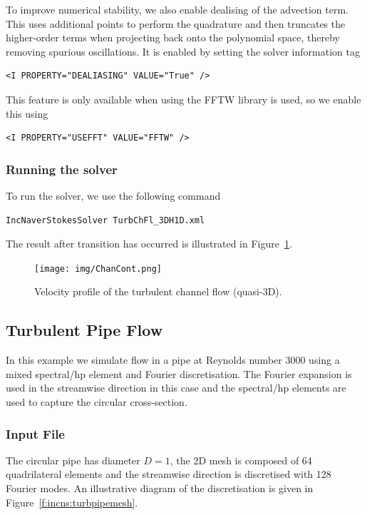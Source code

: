 To improve numerical stability, we also enable dealising of the advection term.
This uses additional points to perform the quadrature and then truncates the
higher-order terms when projecting back onto the polynomial space, thereby
removing spurious oscillations. It is enabled by setting the solver information
tag
\begin{lstlisting}[style=XMLStyle]
<I PROPERTY="DEALIASING" VALUE="True" />
\end{lstlisting}
This feature is only available when using the FFTW library is used, so we enable
this using
\begin{lstlisting}[style=XMLStyle]
<I PROPERTY="USEFFT" VALUE="FFTW" />
\end{lstlisting}


\subsubsection{Running the solver}
To run the solver, we use the following command
\begin{lstlisting}[style=BashInputStyle]
IncNaverStokesSolver TurbChFl_3DH1D.xml
\end{lstlisting}
The result after transition has occurred is illustrated in
Figure~\ref{f:incns:turbchanflow}.

\begin{figure}
\begin{center}
\texttt{[image: img/ChanCont.png]}
\caption{Velocity profile of the turbulent channel flow (quasi-3D).}
\label{f:incns:turbchanflow}
\end{center}
\end{figure}


\subsection{Turbulent Pipe Flow}
In this example we simulate flow in a pipe at Reynolds number 3000 using a mixed
spectral/hp element and Fourier discretisation. The Fourier expansion is used in
the streamwise direction in this case and the spectral/hp elements are used to
capture the circular cross-section.

\subsubsection{Input File}
The circular pipe has diameter $D=1$, the 2D mesh is composed of 64
quadrilateral elements and the streamwise direction is discretised with 128
Fourier modes. An illustrative diagram of the discretisation is given in
Figure~\ref{f:incns:turbpipemesh}.

